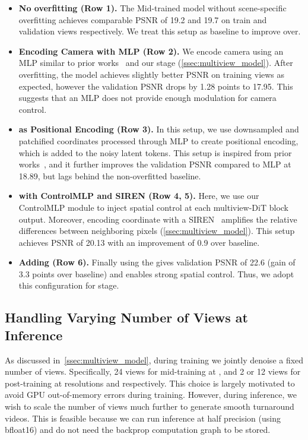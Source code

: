 \begin{itemize}
    \item \textbf{No overfitting (Row 1).} The Mid-trained model without scene-specific overfitting achieves comparable PSNR of 19.2 and 19.7 on train and validation views respectively. We treat this setup as baseline to improve over. 

    \item \textbf{Encoding Camera with MLP (Row 2).} We encode camera using an MLP similar to prior works~\cite{zero1to3, MVDream} and our \midtraining stage (\cref{ssec:multiview_model}). After overfitting, the model achieves slightly better PSNR on training views as expected, however the validation PSNR drops by 1.28 points to 17.95. This suggests that an MLP does not provide enough modulation for camera control. 
    
    \item \textbf{\plucker as Positional Encoding (Row 3).} In this setup, we use downsampled and patchified \plucker coordinates processed through MLP to create positional encoding, which is added to the noisy latent tokens. This setup is inspired from  prior works~\cite{RayConditioningGAN,LFNs,kant2024spad,he2024cameractrl,bahmani2024vd3d}, and it further improves the validation PSNR compared to MLP at 18.89, but lags behind the non-overfitted baseline.

    \item \textbf{\plucker with ControlMLP and SIREN (Row 4, 5).} Here, we use our ControlMLP module to inject spatial control at each multiview-DiT block output. Moreover, encoding \plucker coordinate with a SIREN~\cite{SIREN} amplifies the relative differences between neighboring pixels (\cref{ssec:multiview_model}). This setup achieves PSNR of 20.13 with an improvement of 0.9 over baseline.

    \item \textbf{Adding \spatialanchor (Row 6).} Finally using the \spatialanchor gives validation PSNR of 22.6 (gain of 3.3 points over baseline) and enables strong spatial control. Thus, we adopt this configuration for \posttraining stage.
\end{itemize}

\subsection{Handling Varying Number of Views at Inference}\label{ssec:scaling_views}

As discussed in~\cref{ssec:multiview_model}, during training we jointly denoise a fixed number of views. Specifically, 24 views for mid-training at \resone, and 2 or 12 views for post-training at resolutions \resthree and \resfour respectively. This choice is largely motivated to avoid GPU out-of-memory errors during training. However, during inference, we wish to scale the number of views much further to generate smooth turnaround videos. This is feasible because we can run inference at half precision (using bfloat16) and do not need the backprop computation graph to be stored. 

